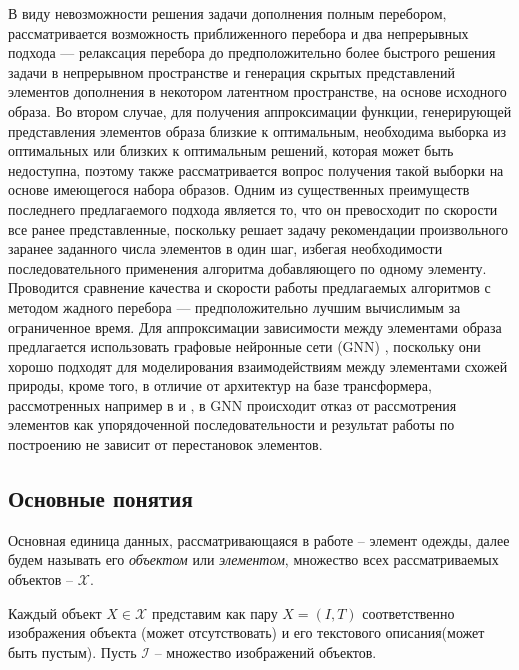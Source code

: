 \documentclass[a4paper,14pt]{extarticle}
\begin{document}
		В виду невозможности решения задачи дополнения полным перебором, рассматривается возможность приближенного перебора и два непрерывных подхода --- релаксация перебора до предположительно более быстрого решения задачи в непрерывном пространстве и генерация скрытых представлений элементов дополнения в некотором латентном пространстве, на основе исходного образа. Во втором случае, для получения аппроксимации функции, генерирующей представления элементов образа близкие к оптимальным, необходима выборка из оптимальных или близких к оптимальным решений, которая может быть недоступна, поэтому также рассматривается вопрос получения такой выборки на основе имеющегося набора образов. Одним из существенных преимуществ последнего предлагаемого подхода является то, что он превосходит по скорости все ранее представленные, поскольку решает задачу рекомендации произвольного заранее заданного числа элементов в один шаг, избегая необходимости последовательного применения алгоритма добавляющего по одному элементу. Проводится сравнение качества и скорости работы предлагаемых алгоритмов с методом жадного перебора --- предположительно лучшим вычислимым за ограниченное время. 
		Для аппроксимации зависимости между элементами образа предлагается использовать графовые нейронные сети (GNN) \cite{scarselli2008graph}, поскольку они хорошо подходят для моделирования взаимодействиям между элементами схожей природы, кроме того, в отличие от архитектур на базе трансформера, \cite{https://doi.org/10.48550/arXiv.1706.03762} рассмотренных например в  \cite{https://doi.org/10.48550/arXiv.2204.04812} и \cite{yang2020learning}, в GNN происходит отказ от рассмотрения элементов как упорядоченной последовательности и результат работы по построению не зависит от перестановок элементов.
			
		\subsection{Основные понятия}
			Основная единица данных, рассматривающаяся в работе -- элемент одежды, далее будем называть его \textit{объектом} или \textit{элементом}, множество всех рассматриваемых объектов -- $\mathcal{X}$. 
			
			Каждый объект $X\in\mathcal{X}$ представим как пару $X = (I, T)$ соответственно изображения объекта (может отсутствовать) и его текстового описания(может быть пустым). Пусть $\mathcal{I}$ -- множество изображений объектов.
			
\end{document}
